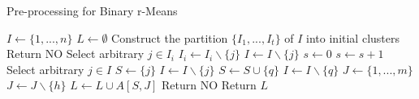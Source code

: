 \begin{algorithm}[H]
    \caption{Pre-processing for Binary r-Means}
    \label{kernel}
    \begin{algorithmic}[1]
            \State $I \gets \{1,...,n\}$
            \State $L \gets \emptyset$
            \State Construct the partition $\{I_1,...,I_t\}$ of $I$ into initial clusters
                \State Return NO
            \Else
                        \State Select arbitrary $j \in I_i$
                        \State $I_i \gets I_i \backslash \{j\}$
                        \State $I \gets I \backslash \{j\}$
                    \EndWhile
                \EndFor
                \State $s \gets 0$
                    \State $s \gets s+1$
                    \State Select arbitrary $j \in I$
                    \State $S \gets \{j\}$
                    \State $I \gets I \backslash \{j\}$
                        \State $S \gets S \cup \{q\}$
                        \State $I \gets I \backslash \{q\}$
                    \EndWhile
                    \State $J \gets \{1,...,m\}$
                        \State $J \gets J \backslash \{h\}$
                    \EndWhile
                    \State $L \gets L \cup A[S,J]$
                \EndWhile
            \EndIf
                \State Return NO
            \Else
                \State Return $L$
            \EndIf
        \EndProcedure
    \end{algorithmic}
\end{algorithm}